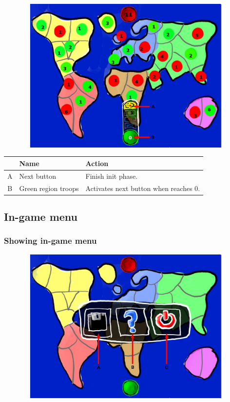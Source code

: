 \documentclass[12pt,a4paper]{article}
\begin{document}
\begin{figure}[H]
  \centering
  \includegraphics[width=11cm]{pic/mocks/3-6.pdf}
\end{figure}

\begin{table}[H]
\small
\centering
\begin{tabular}{c|p{5cm}|p{7cm}}
& Name & Action \\ \hline\hline
A
&Next button
&Finish init phase.
\\B
&Green region troops
&Activates next button when reaches 0.
\end{tabular}
\end{table}


\subsection{In-game menu}\label{mock:74}

\subsubsection{Showing in-game menu}\label{mock:741}

\begin{figure}[H]
  \centering
  \includegraphics[width=11cm]{pic/mocks/4-1.pdf}
\end{figure}
\end{document}
